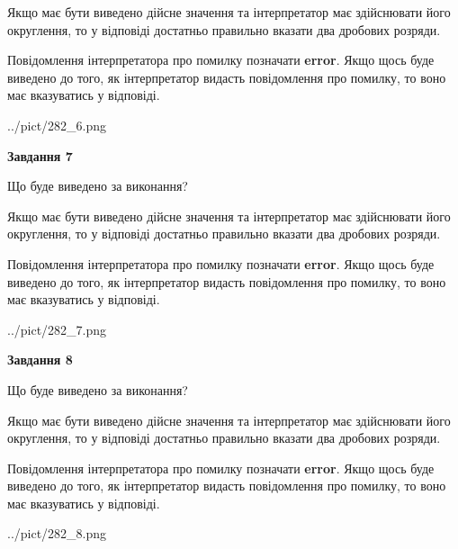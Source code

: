 \documentclass[12pt, ukrainian]{article}
\begin{document}
{\begin {Large}
Якщо має бути виведено дійсне значення та інтерпретатор має здійснювати його округлення, 
то у відповіді достатньо правильно вказати два дробових розряди.

Повідомлення інтерпретатора про помилку позначати \textbf{error}.
Якщо щось буде виведено до того, як інтерпретатор видасть повідомлення про помилку, 
то воно має вказуватись у відповіді. \par

\begin{center}
	{../pict/282_6.png}
\end{center}
\newpage

{\begin {center}\textbf{Завдання 7}\end {center}}\par
Що буде виведено за виконання? \par

Якщо має бути виведено дійсне значення та інтерпретатор має здійснювати його округлення, 
то у відповіді достатньо правильно вказати два дробових розряди.

Повідомлення інтерпретатора про помилку позначати \textbf{error}.
Якщо щось буде виведено до того, як інтерпретатор видасть повідомлення про помилку, 
то воно має вказуватись у відповіді. \par

\begin{center}
	{../pict/282_7.png}
\end{center}
\newpage

{\begin {center}\textbf{Завдання 8}\end {center}}\par
Що буде виведено за виконання? \par

Якщо має бути виведено дійсне значення та інтерпретатор має здійснювати його округлення, 
то у відповіді достатньо правильно вказати два дробових розряди.

Повідомлення інтерпретатора про помилку позначати \textbf{error}.
Якщо щось буде виведено до того, як інтерпретатор видасть повідомлення про помилку, 
то воно має вказуватись у відповіді. \par

\begin{center}
	{../pict/282_8.png}
\end{center}
\newpage


\end{Large}}
\end{document}
